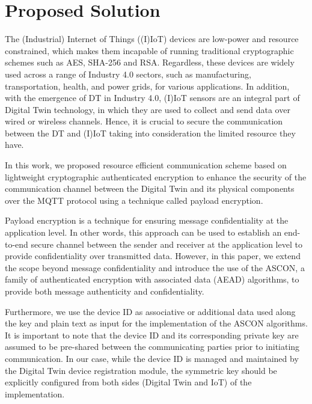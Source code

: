 

\section{Proposed Solution  }
\label{sec:prosolution}

The (Industrial) Internet of Things ((I)IoT) devices are low-power and resource constrained, which makes them incapable of running traditional cryptographic
schemes such as AES, SHA-256 and RSA. Regardless, these devices are widely used across a range of Industry 4.0 sectors, such as manufacturing, transportation, health, and power
grids, for various applications. In addition, with the emergence of DT in Industry 4.0, (I)IoT sensors are an integral part of Digital Twin technology, in which they are used to collect and send data over wired or wireless channels. Hence, it is crucial to secure the communication between the DT and (I)IoT taking into consideration the limited resource they have. 


In this work, we proposed resource efficient communication scheme based on lightweight cryptographic authenticated encryption to enhance the security of the communication channel between the Digital Twin and its physical components over the MQTT protocol using a technique called payload encryption.



Payload encryption is a technique for ensuring message confidentiality at the application level. In other words, this approach can be used to establish an end-to-end secure channel between the sender and receiver at the application level to provide confidentiality over transmitted data. However, in this paper, we extend the scope beyond message confidentiality and introduce the use of the ASCON, a family of authenticated encryption with associated data (AEAD) algorithms, to provide both message authenticity and confidentiality.

Furthermore, we use the device ID as associative or additional data used along the key and plain text as input for the implementation of the ASCON algorithms. It is important to note that the device ID and its corresponding private key are assumed to be pre-shared between the communicating parties prior to initiating communication. In our case, while the device ID is managed and maintained by the Digital Twin device registration module, the symmetric key should be explicitly configured from both sides (Digital Twin and IoT) of the implementation.  

